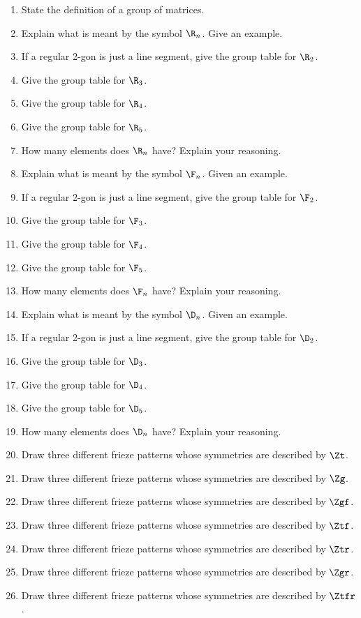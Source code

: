 \problems
\begin{enumerate}
\item State the definition of a group of matrices.
\item Explain what is meant by the symbol $\R_n$. Give an example.
\item If a regular 2-gon is just a line segment, give the group table
  for $\R_2$.
\item Give the group table for $\R_3$.
\item Give the group table for $\R_4$.
\item Give the group table for $\R_5$.
\item How many elements does $\R_n$ have? Explain your reasoning.
\item Explain what is meant by the symbol $\F_n$. Given an example. 
\item If a regular 2-gon is just a line segment, give the group table
  for $\F_2$.
\item Give the group table for $\F_3$.
\item Give the group table for $\F_4$.
\item Give the group table for $\F_5$.
\item How many elements does $\F_n$ have? Explain your reasoning.
\item Explain what is meant by the symbol $\D_n$. Given an example.
\item If a regular 2-gon is just a line segment, give the group table
  for $\D_2$.
\item Give the group table for $\D_3$.
\item Give the group table for $\D_4$.
\item Give the group table for $\D_5$.
\item How many elements does $\D_n$ have? Explain your reasoning.
\item Draw three different frieze patterns whose symmetries are
  described by $\Zt$.
\item Draw three different frieze patterns whose symmetries are
  described by $\Zg$.
\item Draw three different frieze patterns whose symmetries are
  described by $\Zgf$.
\item Draw three different frieze patterns whose symmetries are
  described by $\Ztf$.
\item Draw three different frieze patterns whose symmetries are
  described by $\Ztr$.
\item Draw three different frieze patterns whose symmetries are
  described by $\Zgr$.
\item Draw three different frieze patterns whose symmetries are
  described by $\Ztfr$.

\end{enumerate}

